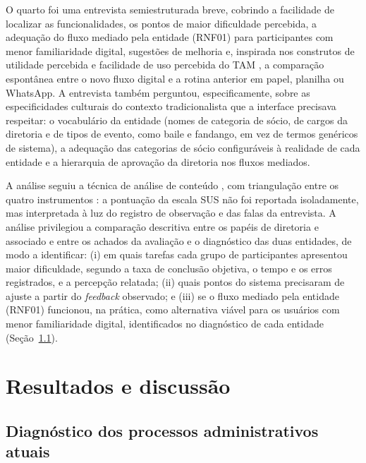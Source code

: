 \documentclass[12pt,a4paper]{article}
\begin{document}
O quarto foi uma entrevista semiestruturada
breve, cobrindo a facilidade de localizar as funcionalidades, os pontos de maior dificuldade
percebida, a adequação do fluxo mediado pela entidade (RNF01) para participantes com menor
familiaridade digital, sugestões de melhoria e, inspirada nos construtos de utilidade percebida e
facilidade de uso percebida do TAM \parencite{davis1989}, a comparação espontânea entre o novo fluxo
digital e a rotina anterior em papel, planilha ou WhatsApp. A entrevista também perguntou,
especificamente, sobre as especificidades culturais do contexto tradicionalista que a interface
precisava respeitar: o vocabulário da entidade (nomes de categoria de sócio, de cargos da diretoria e
de tipos de evento, como baile e fandango, em vez de termos genéricos de sistema), a adequação das
categorias de sócio configuráveis à realidade de cada entidade e a hierarquia de aprovação da
diretoria nos fluxos mediados.

A análise seguiu a técnica de análise de conteúdo \parencite{gil2017}, com triangulação entre os
quatro instrumentos \parencite{creswell2014,yin2015}: a pontuação da escala SUS não foi reportada
isoladamente, mas interpretada à luz do registro de observação e das falas da entrevista. A análise
privilegiou a comparação descritiva entre os papéis de diretoria e associado e entre os achados da
avaliação e o diagnóstico das duas entidades, de modo a identificar: (i) em quais tarefas cada grupo de participantes
apresentou maior dificuldade, segundo a taxa de conclusão objetiva, o tempo e os erros registrados, e
a percepção relatada; (ii) quais pontos do sistema precisaram de ajuste a partir do \textit{feedback}
observado; e (iii) se o fluxo mediado pela entidade (RNF01) funcionou, na prática, como alternativa
viável para os usuários com menor familiaridade digital, identificados no diagnóstico de cada
entidade (Seção~\ref{sec:diagnostico}).

\section{Resultados e discussão}

\subsection{Diagnóstico dos processos administrativos atuais}
\label{sec:diagnostico}
\end{document}
